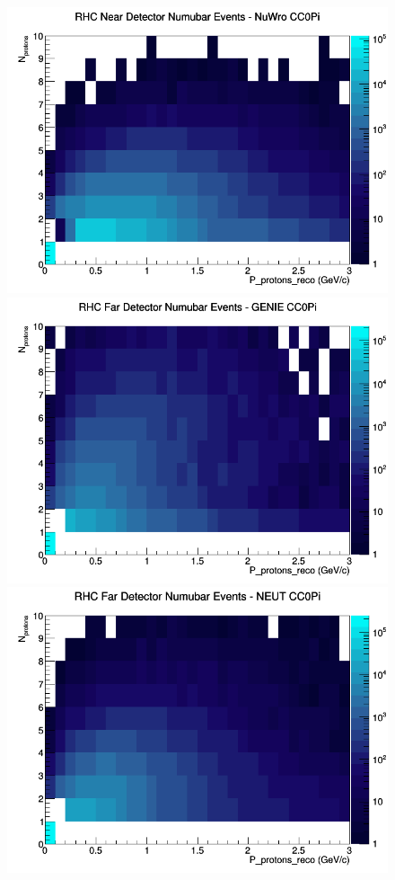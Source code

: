 \documentclass[12pt]{article}
\begin{document}
\begin{figure}[h]
\includegraphics[width=\linewidth]{eff_N_P/FGT/protons/CC0Pi_RHC_ND_numubar_N_P_NuWro.png}
\endminipage
\newline
{}
\includegraphics[width=\linewidth]{eff_N_P/FGT/protons/CC0Pi_RHC_FD_numubar_N_P_GENIE.png}
\endminipage
{}
\includegraphics[width=\linewidth]{eff_N_P/FGT/protons/CC0Pi_RHC_FD_numubar_N_P_NEUT.png}

\end{figure}
\end{document}
